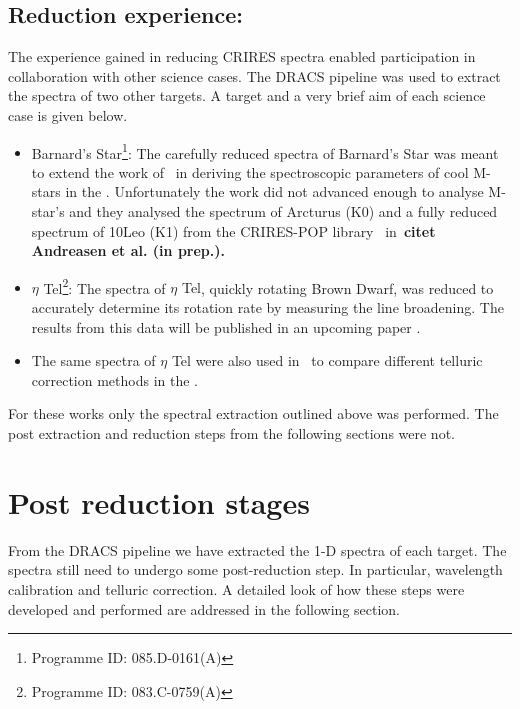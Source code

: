 \subsection{Reduction experience:}
\label{subsec:experience}
The experience gained in reducing {CRIRES} spectra enabled participation in collaboration with other science cases. The {DRACS} pipeline was used to extract the spectra of two other targets. A target and a very brief aim of each science case is given below.
\begin{itemize}
\item Barnard's Star\footnote{Programme {{ID}}: 085.D-0161(A)}: The carefully reduced \nir{} spectra of Barnard's Star was meant to extend the work of~\citet{andreasen_nearinfrared_2016} in deriving the spectroscopic parameters of cool M-stars in the \nir{}. Unfortunately the work did not advanced enough to analyse M-star's and they analysed the spectrum of {Arcturus} (K0) and a fully reduced spectrum of {10Leo} (K1) from the {CRIRES}-POP library~\cite{nicholls_crirespop_2017} in~\bf{citet {Andreasen et al. (in prep.)}}.
\item \(\eta\) Tel\footnote{Programme {{ID}}: 083.C-0759(A)}: The spectra of {\(\eta\) Tel}, quickly rotating Brown Dwarf, was reduced to accurately determine its rotation rate by measuring the line broadening. The results from this data will be published in an upcoming paper .
\item The same spectra of \(\eta\) Tel were also used in~\citet{ulmer-moll_telluric_2018} to compare different telluric correction methods in the \nir{}.
\end{itemize}

For these works only the spectral extraction outlined above was performed. The post extraction and reduction steps from the following sections were not.


\section{Post reduction stages}
\label{sec:posreduction}
From the {DRACS} pipeline we have extracted the 1-D spectra of each target. The spectra still need to undergo some post-reduction step. In particular, wavelength calibration and telluric correction. A detailed look of how these steps were developed and performed are addressed in the following section.

